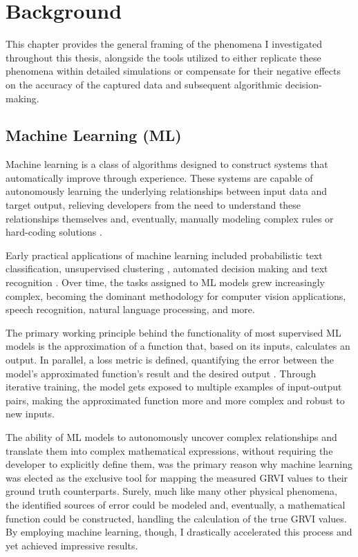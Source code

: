 \chapter{Background}
\label{chap2}

This chapter provides the general framing of the phenomena I investigated throughout this thesis, alongside the tools utilized to either replicate these phenomena within detailed simulations or compensate for their negative effects on the accuracy of the captured data and subsequent algorithmic decision-making. 

\section{Machine Learning (ML)}

 Machine learning is a class of algorithms designed to construct systems that automatically improve through experience. These systems are capable of autonomously learning the underlying relationships between input data and target output, relieving developers from the need to understand these relationships themselves and, eventually, manually modeling complex rules or hard-coding solutions \cite{ml-trends-persp, useful-things-ml}. 

 Early practical applications of machine learning included probabilistic text classification, unsupervised clustering \cite{MacQueen1967SomeMF},  automated decision making \cite{decision-trees} and text recognition \cite{handwritten, lenet}. Over time, the tasks assigned to ML models grew increasingly complex, becoming the dominant methodology for computer vision applications, speech recognition, natural language processing, and more. 

The primary working principle behind the functionality of most supervised ML models is the approximation of a function that, based on its inputs, calculates an output. In parallel, a loss metric is defined, quantifying the error between the model's approximated function's result and the desired output \cite{ml-trends-persp}. Through iterative training, the model gets exposed to multiple examples of input-output pairs, making the approximated function more and more complex and robust to new inputs.

The ability of ML models to autonomously uncover complex relationships and translate them into complex mathematical expressions, without requiring the developer to explicitly define them, was the primary reason why machine learning was elected as the exclusive tool for mapping the measured GRVI values to their ground truth counterparts. Surely, much like many other physical phenomena, the identified sources of error could be modeled and, eventually, a mathematical function could be constructed, handling the calculation of the true GRVI values. By employing machine learning, though, I drastically accelerated this process and yet achieved impressive results.

